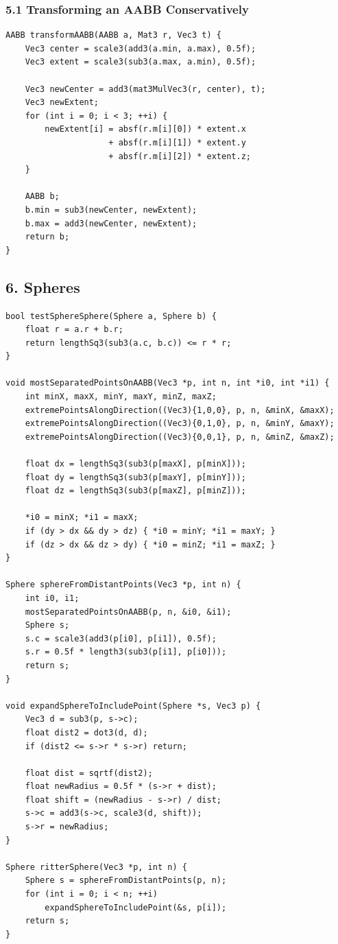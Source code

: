 \documentclass[10pt,letterpaper]{article}
\begin{document}
\subsubsection*{5.1 Transforming an AABB Conservatively}

\begin{verbatim}
AABB transformAABB(AABB a, Mat3 r, Vec3 t) {
    Vec3 center = scale3(add3(a.min, a.max), 0.5f);
    Vec3 extent = scale3(sub3(a.max, a.min), 0.5f);

    Vec3 newCenter = add3(mat3MulVec3(r, center), t);
    Vec3 newExtent;
    for (int i = 0; i < 3; ++i) {
        newExtent[i] = absf(r.m[i][0]) * extent.x
                     + absf(r.m[i][1]) * extent.y
                     + absf(r.m[i][2]) * extent.z;
    }

    AABB b;
    b.min = sub3(newCenter, newExtent);
    b.max = add3(newCenter, newExtent);
    return b;
}
\end{verbatim}


\subsection*{6. Spheres}

\begin{verbatim}
bool testSphereSphere(Sphere a, Sphere b) {
    float r = a.r + b.r;
    return lengthSq3(sub3(a.c, b.c)) <= r * r;
}

void mostSeparatedPointsOnAABB(Vec3 *p, int n, int *i0, int *i1) {
    int minX, maxX, minY, maxY, minZ, maxZ;
    extremePointsAlongDirection((Vec3){1,0,0}, p, n, &minX, &maxX);
    extremePointsAlongDirection((Vec3){0,1,0}, p, n, &minY, &maxY);
    extremePointsAlongDirection((Vec3){0,0,1}, p, n, &minZ, &maxZ);

    float dx = lengthSq3(sub3(p[maxX], p[minX]));
    float dy = lengthSq3(sub3(p[maxY], p[minY]));
    float dz = lengthSq3(sub3(p[maxZ], p[minZ]));

    *i0 = minX; *i1 = maxX;
    if (dy > dx && dy > dz) { *i0 = minY; *i1 = maxY; }
    if (dz > dx && dz > dy) { *i0 = minZ; *i1 = maxZ; }
}

Sphere sphereFromDistantPoints(Vec3 *p, int n) {
    int i0, i1;
    mostSeparatedPointsOnAABB(p, n, &i0, &i1);
    Sphere s;
    s.c = scale3(add3(p[i0], p[i1]), 0.5f);
    s.r = 0.5f * length3(sub3(p[i1], p[i0]));
    return s;
}

void expandSphereToIncludePoint(Sphere *s, Vec3 p) {
    Vec3 d = sub3(p, s->c);
    float dist2 = dot3(d, d);
    if (dist2 <= s->r * s->r) return;

    float dist = sqrtf(dist2);
    float newRadius = 0.5f * (s->r + dist);
    float shift = (newRadius - s->r) / dist;
    s->c = add3(s->c, scale3(d, shift));
    s->r = newRadius;
}

Sphere ritterSphere(Vec3 *p, int n) {
    Sphere s = sphereFromDistantPoints(p, n);
    for (int i = 0; i < n; ++i)
        expandSphereToIncludePoint(&s, p[i]);
    return s;
}
\end{verbatim}
\end{document}
